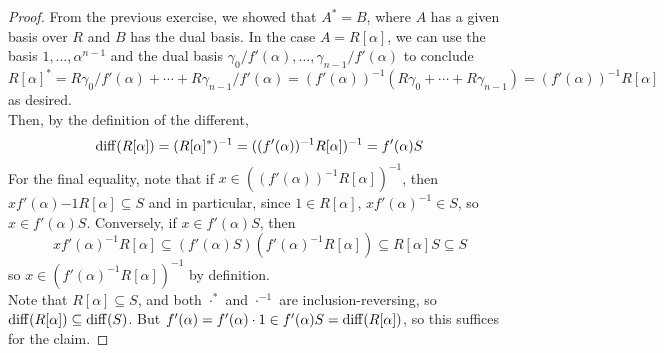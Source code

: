 \begin{proof}
	From the previous exercise, we showed that $A^\ast = B$, where $A$ has a given basis over $R$ and $B$ has the dual basis. In the case $A = R[\alpha]$, we can use the basis $1,\ldots,\alpha^{n-1}$ and the dual basis $\gamma_0/f'(\alpha),\ldots,\gamma_{n-1}/f'(\alpha)$ to conclude
	\[ R[\alpha]^\ast = R\gamma_0/f'(\alpha) + \cdots + R\gamma_{n-1}/f'(\alpha) = (f'(\alpha))^{-1}(R\gamma_0 + \cdots + R\gamma_{n-1}) = (f'(\alpha))^{-1}R[\alpha] \]
	as desired. \\
	
	Then, by the definition of the different,
	\[ \operatorname{diff}(R[\alpha]) = (R[\alpha]^\ast)^{-1} = ((f'(\alpha))^{-1}R[\alpha])^{-1} = f'(\alpha)S \]
	For the final equality, note that if $x \in ((f'(\alpha))^{-1}R[\alpha])^{-1}$, then $xf'(\alpha){-1}R[\alpha] \subseteq S$ and in particular, since $1 \in R[\alpha]$, $xf'(\alpha)^{-1} \in S$, so $x \in f'(\alpha)S$. Conversely, if $x \in f'(\alpha)S$, then
	\[ xf'(\alpha)^{-1}R[\alpha] \subseteq (f'(\alpha)S)(f'(\alpha)^{-1}R[\alpha]) \subseteq R[\alpha]S \subseteq S \]
	so $x \in (f'(\alpha)^{-1}R[\alpha])^{-1}$ by definition. \\
	
	Note that $R[\alpha] \subseteq S$, and both $\cdot^\ast$ and $\cdot^{-1}$ are inclusion-reversing, so $\operatorname{diff}(R[\alpha]) \subseteq \operatorname{diff}(S)$. But $f'(\alpha) = f'(\alpha) \cdot 1 \in f'(\alpha)S = \operatorname{diff}(R[\alpha])$, so this suffices for the claim.
\end{proof}
